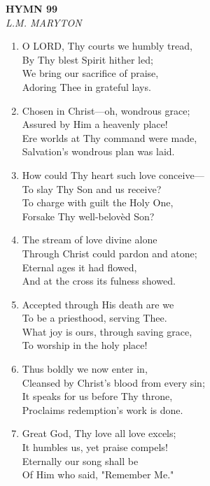 \documentclass[11pt,a4paper]{article}
\begin{document}
\newpage
\begin{center}
    {\Large \textbf{HYMN 99\textdagger{}}}
    \\
    \textit{L.M. MARYTON}
\end{center}
\vspace{1em}

\begin{enumerate}
    \item O LORD, Thy courts we humbly tread, \\
        By Thy blest Spirit hither led; \\
        We bring our sacrifice of praise, \\
        Adoring Thee in grateful lays.

    \item Chosen in Christ---oh, wondrous grace; \\
        Assured by Him a heavenly place! \\
        Ere worlds at Thy command were made, \\
        Salvation's wondrous plan was laid.

    \item How could Thy heart such love conceive--- \\
        To slay Thy Son and us receive? \\
        To charge with guilt the Holy One, \\
        Forsake Thy well-belov\`ed Son?

    \item The stream of love divine alone \\
        Through Christ could pardon and atone; \\
        Eternal ages it had flowed, \\
        And at the cross its fulness showed.

    \item Accepted through His death are we \\
        To be a priesthood, serving Thee. \\
        What joy is ours, through saving grace, \\
        To worship in the holy place!

    \item Thus boldly we now enter in, \\
        Cleansed by Christ's blood from every sin; \\
        It speaks for us before Thy throne, \\
        Proclaims redemption's work is done.

    \item Great God, Thy love all love excels; \\
        It humbles us, yet praise compels! \\
        Eternally our song shall be \\
        Of Him who said, "Remember Me."

\end{enumerate}
\end{document}
